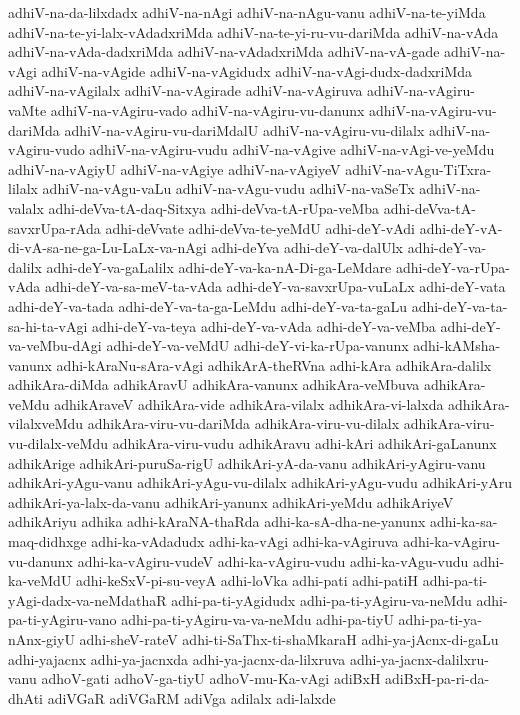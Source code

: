 {adhiV-na-da-lilxdadx
adhiV-na-nAgi
adhiV-na-nAgu-vanu
adhiV-na-te-yiMda
adhiV-na-te-yi-lalx-vAdadxriMda
adhiV-na-te-yi-ru-vu-dariMda
adhiV-na-vAda
adhiV-na-vAda-dadxriMda
adhiV-na-vAdadxriMda
adhiV-na-vA-gade
adhiV-na-vAgi
adhiV-na-vAgide
adhiV-na-vAgidudx
adhiV-na-vAgi-dudx-dadxriMda
adhiV-na-vAgilalx
adhiV-na-vAgirade
adhiV-na-vAgiruva
adhiV-na-vAgiru-vaMte
adhiV-na-vAgiru-vado
adhiV-na-vAgiru-vu-danunx
adhiV-na-vAgiru-vu-dariMda
adhiV-na-vAgiru-vu-dariMdalU
adhiV-na-vAgiru-vu-dilalx
adhiV-na-vAgiru-vudo
adhiV-na-vAgiru-vudu
adhiV-na-vAgive
adhiV-na-vAgi-ve-yeMdu
adhiV-na-vAgiyU
adhiV-na-vAgiye
adhiV-na-vAgiyeV
adhiV-na-vAgu-TiTxra-lilalx
adhiV-na-vAgu-vaLu
adhiV-na-vAgu-vudu
adhiV-na-vaSeTx
adhiV-na-valalx
adhi-deVva-tA-daq-Sitxya
adhi-deVva-tA-rUpa-veMba
adhi-deVva-tA-savxrUpa-rAda
adhi-deVvate
adhi-deVva-te-yeMdU
adhi-deY-vAdi
adhi-deY-vA-di-vA-sa-ne-ga-Lu-LaLx-va-nAgi
adhi-deYva
adhi-deY-va-dalUlx
adhi-deY-va-dalilx
adhi-deY-va-gaLalilx
adhi-deY-va-ka-nA-Di-ga-LeMdare
adhi-deY-va-rUpa-vAda
adhi-deY-va-sa-meV-ta-vAda
adhi-deY-va-savxrUpa-vuLaLx
adhi-deY-vata
adhi-deY-va-tada
adhi-deY-va-ta-ga-LeMdu
adhi-deY-va-ta-gaLu
adhi-deY-va-ta-sa-hi-ta-vAgi
adhi-deY-va-teya
adhi-deY-va-vAda
adhi-deY-va-veMba
adhi-deY-va-veMbu-dAgi
adhi-deY-va-veMdU
adhi-deY-vi-ka-rUpa-vanunx
adhi-kAMsha-vanunx
adhi-kAraNu-sAra-vAgi
adhikArA-theRVna
adhi-kAra
adhikAra-dalilx
adhikAra-diMda
adhikAravU
adhikAra-vanunx
adhikAra-veMbuva
adhikAra-veMdu
adhikAraveV
adhikAra-vide
adhikAra-vilalx
adhikAra-vi-lalxda
adhikAra-vilalxveMdu
adhikAra-viru-vu-dariMda
adhikAra-viru-vu-dilalx
adhikAra-viru-vu-dilalx-veMdu
adhikAra-viru-vudu
adhikAravu
adhi-kAri
adhikAri-gaLanunx
adhikArige
adhikAri-puruSa-rigU
adhikAri-yA-da-vanu
adhikAri-yAgiru-vanu
adhikAri-yAgu-vanu
adhikAri-yAgu-vu-dilalx
adhikAri-yAgu-vudu
adhikAri-yAru
adhikAri-ya-lalx-da-vanu
adhikAri-yanunx
adhikAri-yeMdu
adhikAriyeV
adhikAriyu
adhika
adhi-kAraNA-thaRda
adhi-ka-sA-dha-ne-yanunx
adhi-ka-sa-maq-didhxge
adhi-ka-vAdadudx
adhi-ka-vAgi
adhi-ka-vAgiruva
adhi-ka-vAgiru-vu-danunx
adhi-ka-vAgiru-vudeV
adhi-ka-vAgiru-vudu
adhi-ka-vAgu-vudu
adhi-ka-veMdU
adhi-keSxV-pi-su-veyA
adhi-loVka
adhi-pati
adhi-patiH
adhi-pa-ti-yAgi-dadx-va-neMdathaR
adhi-pa-ti-yAgidudx
adhi-pa-ti-yAgiru-va-neMdu
adhi-pa-ti-yAgiru-vano
adhi-pa-ti-yAgiru-va-va-neMdu
adhi-pa-tiyU
adhi-pa-ti-ya-nAnx-giyU
adhi-sheV-rateV
adhi-ti-SaThx-ti-shaMkaraH
adhi-ya-jAcnx-di-gaLu
adhi-yajacnx
adhi-ya-jacnxda
adhi-ya-jacnx-da-lilxruva
adhi-ya-jacnx-dalilxru-vanu
adhoV-gati
adhoV-ga-tiyU
adhoV-mu-Ka-vAgi
adiBxH
adiBxH-pa-ri-da-dhAti
adiVGaR
adiVGaRM
adiVga
adilalx
adi-lalxde
}

